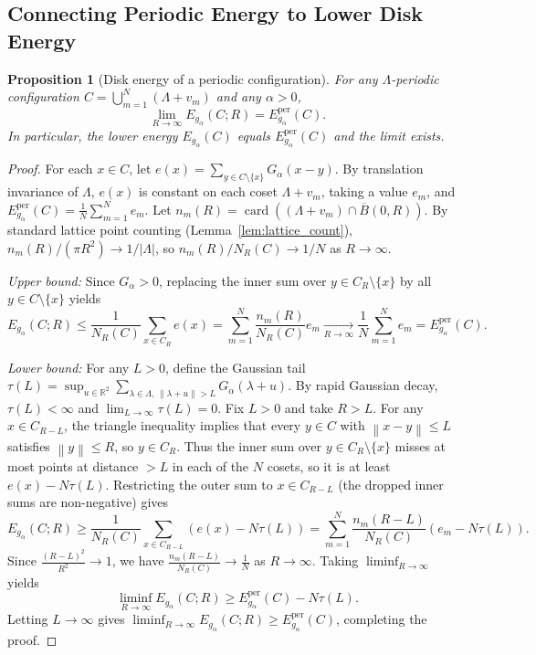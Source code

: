 \documentclass[11pt, a4paper]{article}
\newtheorem{proposition}[theorem]{Proposition}
\theoremstyle{definition}
\theoremstyle{remark}
\newcommand{\R}{\mathbb{R}}
\newcommand{\Bbar}{\overline{B}}
\newcommand{\norm}[1]{\left\lVert #1 \right\rVert}
\newcommand{\abs}[1]{\left\lvert #1 \right\rvert}
\begin{document}
\subsection{Connecting Periodic Energy to Lower Disk Energy}

\begin{proposition}[Disk energy of a periodic configuration]
\label{prop:periodic_disk}
For any $\Lambda$-periodic configuration $C = \bigcup_{m=1}^N (\Lambda + v_m)$ and any $\alpha > 0$,
\[
\lim_{R \to \infty} E_{g_\alpha}(C; R) = E_{g_\alpha}^{\text{per}}(C).
\]
In particular, the lower energy $E_{g_\alpha}(C)$ equals $E_{g_\alpha}^{\text{per}}(C)$ and the limit exists.
\end{proposition}

\begin{proof}
For each $x \in C$, let $e(x) = \sum_{y \in C \setminus \{x\}} G_\alpha(x - y)$. By translation invariance of $\Lambda$, $e(x)$ is constant on each coset $\Lambda + v_m$, taking a value $e_m$, and $E_{g_\alpha}^{\text{per}}(C) = \frac{1}{N} \sum_{m=1}^N e_m$. Let $n_m(R) = \operatorname{card}((\Lambda + v_m) \cap \Bbar(0, R))$. By standard lattice point counting (Lemma~\ref{lem:lattice_count}), $n_m(R)/(\pi R^2) \to 1/\abs{\Lambda}$, so $n_m(R)/N_R(C) \to 1/N$ as $R \to \infty$.

\noindent \textit{Upper bound:} Since $G_\alpha > 0$, replacing the inner sum over $y \in C_R \setminus \{x\}$ by all $y \in C \setminus \{x\}$ yields
\[
E_{g_\alpha}(C; R) \le \frac{1}{N_R(C)} \sum_{x \in C_R} e(x) = \sum_{m=1}^N \frac{n_m(R)}{N_R(C)} e_m \xrightarrow[R \to \infty]{} \frac{1}{N} \sum_{m=1}^N e_m = E_{g_\alpha}^{\text{per}}(C).
\]

\noindent \textit{Lower bound:} For any $L > 0$, define the Gaussian tail $\tau(L) = \sup_{u \in \R^2} \sum_{\lambda \in \Lambda, \, \norm{\lambda + u} > L} G_\alpha(\lambda + u)$. By rapid Gaussian decay, $\tau(L) < \infty$ and $\lim_{L \to \infty} \tau(L) = 0$. Fix $L > 0$ and take $R > L$. For any $x \in C_{R - L}$, the triangle inequality implies that every $y \in C$ with $\norm{x - y} \le L$ satisfies $\norm{y} \le R$, so $y \in C_R$. Thus the inner sum over $y \in C_R \setminus \{x\}$ misses at most points at distance $> L$ in each of the $N$ cosets, so it is at least $e(x) - N \tau(L)$. Restricting the outer sum to $x \in C_{R-L}$ (the dropped inner sums are non-negative) gives
\[
E_{g_\alpha}(C; R) \ge \frac{1}{N_R(C)} \sum_{x \in C_{R-L}} \left(e(x) - N \tau(L)\right) = \sum_{m=1}^N \frac{n_m(R-L)}{N_R(C)} \left(e_m - N \tau(L)\right).
\]
Since $\frac{(R-L)^2}{R^2} \to 1$, we have $\frac{n_m(R-L)}{N_R(C)} \to \frac{1}{N}$ as $R \to \infty$. Taking $\liminf_{R \to \infty}$ yields
\[
\liminf_{R \to \infty} E_{g_\alpha}(C; R) \ge E_{g_\alpha}^{\text{per}}(C) - N \tau(L).
\]
Letting $L \to \infty$ gives $\liminf_{R \to \infty} E_{g_\alpha}(C; R) \ge E_{g_\alpha}^{\text{per}}(C)$, completing the proof.
\end{proof}
\end{document}
